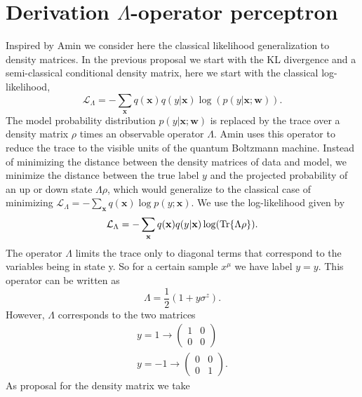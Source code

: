 \chapter{Derivation $\Lambda$-operator perceptron}\label{sec:amin}

Inspired by Amin \cite{Amin2018} we consider here the classical likelihood generalization to density matrices. In the previous proposal we start with the KL divergence and a semi-classical conditional density matrix, here we start with the classical log-likelihood,
\begin{equation}
    \mathcal{L}_\Lambda = - \sum_\mathbf{x} q(\mathbf{x})q(y|\mathbf{x}) \log(p(y|\mathbf{x};\mathbf{w})).
\end{equation}
The model probability distribution $p(y|\mathbf{x};\mathbf{w})$ is replaced by the trace over a density matrix $\rho$ times an observable operator $\Lambda$. Amin uses this operator to reduce the trace to the visible units of the quantum Boltzmann machine. Instead of minimizing the distance between the density matrices of data and model, we minimize the distance between the true label $y$ and the projected probability of an up or down state $\Lambda \rho$, which would generalize to the classical case of minimizing $\mathcal{L}_\Lambda = -\sum_\mathbf{x} q(\mathbf{x}) \log p(y;\mathbf{x})$. We use the log-likelihood given by
\begin{equation}
    \mathcal{L}_\Lambda = - \sum_\mathbf{x} q(\mathbf{x})q(y|\mathbf{x})\log(\Tr{\Lambda \rho}).
\end{equation}
The operator $\Lambda$ limits the trace only to diagonal terms that correspond to the variables being in state y. So for a certain sample $x^\mu$ we have label $y = y$. This operator can be written as
\begin{equation*}
    \Lambda = \frac{1}{2} (1 + y\sigma^z).
\end{equation*}
However,  $\Lambda$ corresponds to the two matrices
\begin{align*}
    y=1 \rightarrow
    \begin{pmatrix}
        1 & 0\\
        0 & 0  
    \end{pmatrix}\\
    y=-1 \rightarrow
    \begin{pmatrix}
        0 & 0\\
        0 & 1  
    \end{pmatrix}.
\end{align*}
As proposal for the density matrix we take
